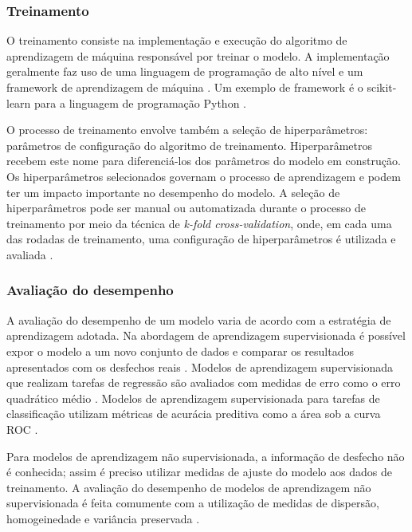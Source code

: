 \subsubsection{Treinamento}

O treinamento consiste na implementação e execução do algoritmo de aprendizagem de máquina responsável por treinar o modelo. A implementação geralmente faz uso de
uma linguagem de programação de alto nível e um framework de aprendizagem de máquina \cite{Greener2021}. Um exemplo de framework é o scikit-learn \cite{ScikitLearn}
para a linguagem de programação Python \cite{Python}.

O processo de treinamento envolve também a seleção de hiperparâmetros: parâmetros de configuração do algoritmo de treinamento. Hiperparâmetros recebem este nome para
diferenciá-los dos parâmetros do modelo em construção. Os hiperparâmetros selecionados governam o processo de aprendizagem e podem ter um impacto importante no desempenho
do modelo. A seleção de hiperparâmetros pode ser manual ou automatizada durante o processo de treinamento por meio da técnica de \textit{k-fold cross-validation}, onde,
em cada uma das rodadas de treinamento, uma configuração de hiperparâmetros é utilizada e avaliada \cite{Delgadillo2020}.

\subsubsection{Avaliação do desempenho}

A avaliação do desempenho de um modelo varia de acordo com a estratégia de aprendizagem adotada. Na abordagem de aprendizagem supervisionada é possível expor o modelo a um
novo conjunto de dados e comparar os resultados apresentados com os desfechos reais \cite{Greener2021}. Modelos de aprendizagem supervisionada que realizam tarefas de regressão
são avaliados com medidas de erro como o erro quadrático médio \cite{Delgadillo2020}. Modelos de aprendizagem supervisionada para tarefas de classificação utilizam métricas de
acurácia preditiva como a área sob a curva ROC \cite{Greener2021 }.

Para modelos de aprendizagem não supervisionada, a informação de desfecho não é conhecida; assim é preciso utilizar medidas de ajuste do modelo aos dados de treinamento. 
A avaliação do desempenho de modelos de aprendizagem não supervisionada é feita comumente com a utilização de medidas de dispersão, homogeinedade e variância preservada
\cite{Naeem2023}.